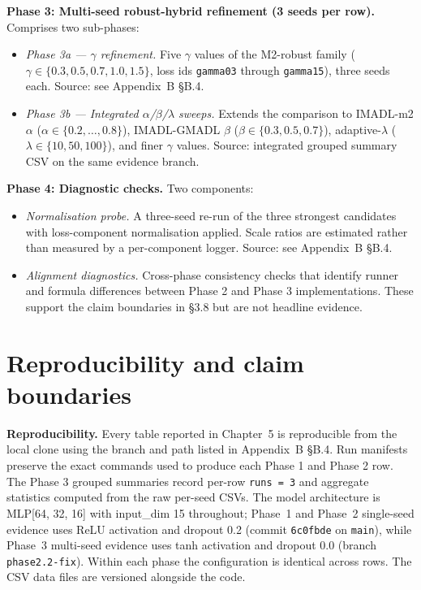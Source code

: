 \textbf{Phase 3: Multi-seed robust-hybrid refinement (3 seeds per row).} Comprises two sub-phases:
\begin{itemize}
 \item \emph{Phase 3a --- $\gamma$ refinement.} Five $\gamma$ values of the M2-robust family ($\gamma \in \{0.3, 0.5, 0.7, 1.0, 1.5\}$, loss ids \texttt{gamma03} through \texttt{gamma15}), three seeds each. Source: see Appendix~B \S B.4.
 \item \emph{Phase 3b --- Integrated $\alpha$/$\beta$/$\lambda$ sweeps.} Extends the comparison to IMADL-m2 $\alpha$ ($\alpha \in \{0.2, \ldots, 0.8\}$), IMADL-GMADL $\beta$ ($\beta \in \{0.3, 0.5, 0.7\}$), adaptive-$\lambda$ ($\lambda \in \{10, 50, 100\}$), and finer $\gamma$ values. Source: integrated grouped summary CSV on the same evidence branch.
\end{itemize}

\textbf{Phase 4: Diagnostic checks.} Two components:
\begin{itemize}
 \item \emph{Normalisation probe.} A three-seed re-run of the three strongest candidates with loss-component normalisation applied. Scale ratios are estimated rather than measured by a per-component logger. Source: see Appendix~B \S B.4.
 \item \emph{Alignment diagnostics.} Cross-phase consistency checks that identify runner and formula differences between Phase 2 and Phase 3 implementations. These support the claim boundaries in \S3.8 but are not headline evidence.
\end{itemize}

\section{Reproducibility and claim boundaries}

\label{sec:reproducibility}

\textbf{Reproducibility.} Every table reported in Chapter~5 is reproducible from the local clone using the branch and path listed in Appendix~B \S B.4. Run manifests preserve the exact commands used to produce each Phase 1 and Phase 2 row. The Phase 3 grouped summaries record per-row \texttt{runs = 3} and aggregate statistics computed from the raw per-seed CSVs. The model architecture is MLP[64, 32, 16] with input\_dim 15 throughout; Phase~1 and Phase~2 single-seed evidence uses ReLU activation and dropout 0.2 (commit \texttt{6c0fbde} on \texttt{main}), while Phase~3 multi-seed evidence uses tanh activation and dropout 0.0 (branch \texttt{phase2.2-fix}). Within each phase the configuration is identical across rows. The CSV data files are versioned alongside the code.

